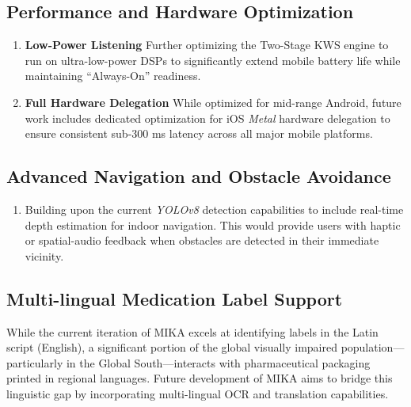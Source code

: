 \documentclass[12pt,a4paper]{report}
\begin{document}
    \subsection{Performance and Hardware Optimization}
    \begin{enumerate}
        \item \textbf{Low-Power Listening} Further optimizing the Two-Stage KWS engine to run on ultra-low-power DSPs to significantly extend mobile battery life while maintaining ``Always-On'' readiness.
        \item \textbf{Full Hardware Delegation} While optimized for mid-range Android, future work includes dedicated optimization for iOS \textit{Metal} hardware delegation to ensure consistent sub-300 ms latency across all major mobile platforms.
    \end{enumerate}
 
    \subsection{Advanced Navigation and Obstacle Avoidance}
    \begin{enumerate}
        \item Building upon the current \textit{YOLOv8} detection capabilities to include real-time depth estimation for indoor navigation. This would provide users with haptic or spatial-audio feedback when obstacles are detected in their immediate vicinity.
    \end{enumerate}
 
\subsection{Multi-lingual Medication Label Support}
 
While the current iteration of MIKA excels at identifying labels in the Latin script (English), a significant portion of the global visually impaired population---particularly in the Global South---interacts with pharmaceutical packaging printed in regional languages. Future development of MIKA aims to bridge this linguistic gap by incorporating multi-lingual OCR and translation capabilities.
 
\end{document}
